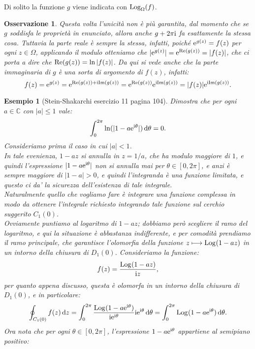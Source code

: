 \documentclass[11pt]{book}
\theoremstyle{Definizione}
\theoremstyle{TeoremaProposizioneLemmaCorollarioCongettura}
\theoremstyle{OsservazioneNotaEsempio}
\newtheorem{myobs}{Osservazione}[section]
\newtheorem{myes}{Esempio}[section]
\newcommand{\C}{\mathbb{C}}
\newcommand{\Disc}[3][]{D^{#1}_{{#2}}({#3})}
\renewcommand{\Re}{\textup{Re}}
\renewcommand{\Im}{\textup{Im}}
\renewcommand{\i}{\textup{i}}
\newcommand{\e}{\textup{e}}
\renewcommand{\d}{\mathrm{d}}
\newcommand{\dz}{\,\d z}
\newcommand{\dtheta}{\, \d \theta}
\newcommand{\Log}[1][]{\textup{Log}_{#1}}
\begin{document}
\noindent
Di solito la funzione $g$ viene indicata con $\Log[\Omega](f)$.
\begin{myobs}
Questa volta l'unicità non è più garantita, dal momento che se $g$ soddisfa le proprietà in enunciato, allora anche $g+2\pi\i$ fa esattamente la stessa cosa. Tuttavia la parte reale è sempre la stessa, infatti, poiché $\e^{g(z)} = f(z)$ per ogni $z\in \Omega$, applicando il modulo otteniamo che $|\e^{g(z)}| = \e^{\Re(g(z))} = |f(z)|$, che ci porta a dire che $\Re(g(z)) = \ln|f(z)|$. Da qui si vede anche che la parte immaginaria di $g$ è una sorta di argomento di $f(z)$, infatti:
$$
f(z) = \e^{g(z)} = \e^{\Re(g(z))+\i\Im(g(z))} = \e^{\Re(g(z))}\e^{\i\Im(g(z))} = |f(z)|\e^{\i\Im(g(z))}.
$$
\end{myobs}
\begin{myes}[Stein-Shakarchi esercizio 11 pagina 104]\label{es:SteinShakarchiEs11pag104}
Dimostra che per ogni $a\in \C$ con $|a| \leq 1$ vale:
$$
\int_{0}^{2\pi} \ln(|1-a\e^{\i\theta}|)\dtheta = 0.
$$
Consideriamo prima il caso in cui $|a| < 1$.\\
In tale evenienza, $1-az$ si annulla in $z = 1/a$, che ha modulo maggiore di $1$, e quindi l'espressione $|1-a\e^{\i\theta}|$ non si annulla mai per $\theta\in [0,2\pi]$, e anzi è sempre maggiore di $|1-a| > 0$, e quindi l'integranda è una funzione limitata, e questo ci da' la sicurezza dell'esistenza di tale integrale.\\
Naturalmente quello che vogliamo fare è integrare una funzione complessa in modo da ottenere l'integrale richiesto integrando tale funzione sul cerchio suggerito $C_{1}(0)$.\\
Ovviamente puntiamo al logaritmo di $1-az$; dobbiamo però scegliere il ramo del logaritmo, e qui la situazione è abbastanza indifferente, e per comodità prendiamo il ramo principale, che garantisce l'olomorfia della funzione $z \longmapsto \Log(1-az)$ in un intorno della chiusura di $\Disc{1}{0}$. Consideriamo la funzione:
$$
f(z) = \frac{\Log(1-az)}{\i z},
$$
per quanto appena discusso, questa è olomorfa in un intorno della chiusura di $\Disc{1}{0}$, e in particolare:
$$
\oint_{C_{1}(0)} f(z)\dz = \int_{0}^{2\pi} \frac{\Log(1-a\e^{\i\theta})}{\i \e^{\i\theta}}\i\e^{\i\theta}\dtheta = \int_{0}^{2\pi} \Log(1-a\e^{\i\theta}) \dtheta.
$$
Ora nota che per ogni $\theta\in [0,2\pi]$, l'espressione $1-a\e^{\i\theta}$ appartiene al semipiano positivo:
\begin{center}
\end{center}
\end{myes}
\end{document}
